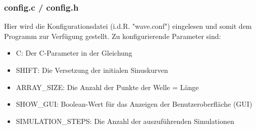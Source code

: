 \subsubsection{config.c / config.h}
Hier wird die Konfigurationsdatei (i.d.R. "wave.conf") eingelesen und somit dem Programm zur Verfügung gestellt. Zu konfigurierende Parameter sind:
\begin{itemize}
	\item C: Der C-Parameter in der Gleichung
	\item SHIFT: Die Versetzung der initialen Sinuskurven
	\item ARRAY\_SIZE: Die Anzahl der Punkte der Welle = Länge
	\item SHOW\_GUI: Boolean-Wert für das Anzeigen der Benutzeroberfläche (GUI)
	\item SIMULATION\_STEPS: Die Anzahl der auszuführenden Simulationen
\end{itemize}